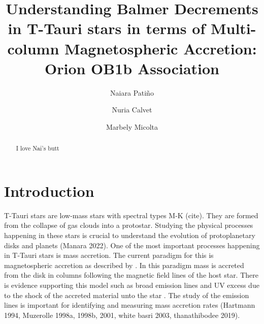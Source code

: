 \documentclass[twocolumn,linenumbers]{aastex631}
\begin{document}
\title{Understanding Balmer Decrements in T-Tauri stars in terms of Multi-column Magnetospheric Accretion: Orion OB1b Association}


\author[0009-0009-7455-6777]{Naiara Patiño}

\author[0000-0002-3950-5386]{Nuria Calvet}

\author[0000-0001-8022-4378]{Marbely Micolta}




\begin{abstract}

I love Nai's butt 
    
\end{abstract}


\section{Introduction}

T-Tauri stars are low-mass stars with spectral types M-K (cite). They are formed from the collapse of gas clouds into a protostar. Studying the physical processes happening in these stars is crucial to understand the evolution of protoplanetary disks and planets (Manara 2022). One of the most important processes happening in T-Tauri stars is mass accretion. The current paradigm for this is magnetospheric accretion as described by \citep{hartmann2016}. In this paradigm mass is accreted from the disk in columns following the magnetic field lines of the host star. There is evidence supporting this model such as broad emission lines \citep{muzerolle2001} and UV excess due to the shock of the accreted material unto the star \citep{calvet_gullbring1998}. The study of the emission lines is important for identifying and measuring mass accretion rates (Hartmann 1994, Muzerolle 1998a, 1998b, 2001, white basri 2003, thanathibodee 2019).
\end{document}
